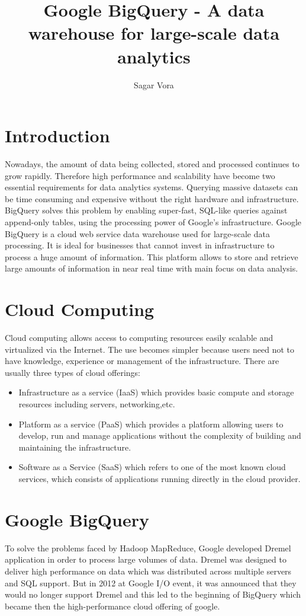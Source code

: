 \documentclass[9pt,twocolumn,twoside]{../../styles/osajnl}
\title{Google BigQuery - A data warehouse for large-scale data analytics}
\author[1]{Sagar Vora}
\affil[1]{School of Informatics and Computing, Bloomington, IN 47408, U.S.A.}
\begin{document}
\maketitle

\section{Introduction}
Nowadays, the amount of data being collected, stored and processed
continues to grow rapidly. Therefore high performance and scalability
have become two essential requirements for data analytics
systems. Querying massive datasets can be time consuming and expensive
without the right hardware and infrastructure. BigQuery solves this
problem by enabling super-fast, SQL-like queries against append-only
tables, using the processing power of Google's infrastructure. Google
BigQuery \cite{www-bigquery} \cite{bigquery-paper} is a cloud web
service data warehouse used for large-scale data processing. It is
ideal for businesses that cannot invest in infrastructure to process a
huge amount of information. This platform allows to store and retrieve
large amounts of information in near real time with main focus on data
analysis.

\section{Cloud Computing}
Cloud computing \cite{www-cloudcomputing}
\cite{benchmark-for-cloud-paper} allows access to computing resources
easily scalable and virtualized via the Internet. The use becomes
simpler because users need not to have knowledge, experience or
management of the infrastructure. There are usually three types of
cloud offerings:\begin{itemize} \item Infrastructure as a service
  (IaaS) which provides basic compute and storage resources including
  servers, networking,etc. \item Platform as a service (PaaS) which
  provides a platform allowing users to develop, run and manage
  applications without the complexity of building and maintaining the
  infrastructure. \item Software as a Service (SaaS) which refers to
  one of the most known cloud services, which consists of applications
  running directly in the cloud provider. \end{itemize}

\noindent

\section{Google BigQuery}
To solve the problems faced by Hadoop\cite{www-apache-hadoop}
MapReduce\cite{mapreduce-article}, Google developed Dremel application
in order to process large volumes of data. Dremel was designed to
deliver high performance on data which was distributed across multiple
servers and SQL support. But in 2012 at Google I/O event, it was
announced that they would no longer support Dremel and this led to the
beginning of BigQuery which became then the high-performance cloud
offering of google.
\end{document}
